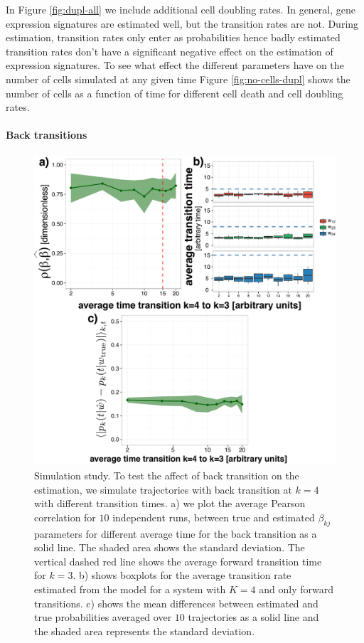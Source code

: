 In Figure \ref{fig:dupl-all} we include additional cell doubling rates. In general, gene expression signatures are estimated well, but the transition rates are not. During estimation, transition rates only enter as probabilities hence badly estimated transition rates don't have a significant negative effect on the estimation of expression signatures. To see what effect the different parameters have on the number of cells simulated at any given time Figure \ref{fig:no-cells-dupl} shows the number of cells as a function of time for different cell death and cell doubling rates.



\paragraph{Back transitions}
\label{sec:back-transitions}

\begin{figure}
  \centering \includegraphics[width=1\textwidth]{pics/back-trans.pdf}
  \caption{Simulation study. To test the affect of back transition on the estimation, we simulate trajectories with back transition at $k=4$ with different transition times. a) we plot the average Pearson correlation for $10$ independent runs, between true and estimated $\beta_{kj}$ parameters for different average time for the back transition as a solid line. The shaded area shows the standard deviation. The vertical dashed red line shows the average forward transition time for $k=3$. b) shows boxplots for the average transition rate estimated from the model for a system with $K=4$ and only forward transitions. c) shows the mean differences between estimated and true probabilities averaged over $10$ trajectories as a solid line and the shaded area represents the standard deviation.}
    \label{fig:back}
\end{figure}



